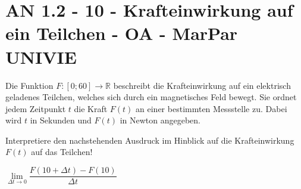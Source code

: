 \section{AN 1.2 - 10 - Krafteinwirkung auf ein Teilchen - OA - MarPar UNIVIE}

\begin{beispiel}[AN 1.2]{1}
Die Funktion $F\!:[0;60]\rightarrow\mathbb{R}$ beschreibt die Krafteinwirkung auf ein elektrisch geladenes Teilchen, welches sich durch ein magnetisches Feld bewegt. Sie ordnet jedem Zeitpunkt $t$ die Kraft $F(t)$ an einer bestimmten Messstelle zu. Dabei wird $t$ in Sekunden und $F(t)$ in Newton angegeben.

Interpretiere den nachstehenden Ausdruck im Hinblick auf die Krafteinwirkung $F(t)$ auf das Teilchen!\leer

$\lim\limits_{\Delta t\rightarrow 0}\dfrac{F(10+\Delta t)-F(10)}{\Delta t}$

\end{beispiel}